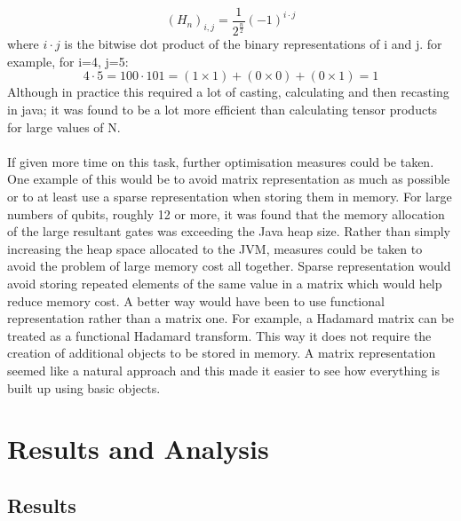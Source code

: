 \documentclass[12pt]{report}
\begin{document}
\begin{equation}
(H_n)_{i,j} = \frac{1}{2^{\frac{n}{2}}}(-1)^{i\cdot j}
\end{equation}
where $i\cdot j$ is the bitwise dot product of the binary representations of i and j. for example, for i=4, j=5:
\begin{equation}
4\cdot 5 = 100 \cdot 101 = (1\times 1)+(0\times 0) +(0 \times 1) = 1
\end{equation}
Although in practice this required a lot of casting, calculating and then recasting in java; it was found to be a lot more efficient than calculating tensor products for large values of N. \\ \\ If given more time on this task, further optimisation measures could be taken.  One example of this would be to avoid matrix representation as much as possible or to at least use a sparse representation when storing them in memory.  For large numbers of qubits, roughly 12 or more, it was found that the memory allocation of the large resultant gates was exceeding the Java heap size.  Rather than simply increasing the heap space allocated to the JVM, measures could be taken to avoid the problem of large memory cost all together.  Sparse representation would avoid storing repeated elements of the same value in a matrix which would help reduce memory cost.  A better way would have been to use functional representation rather than a matrix one.  For example, a Hadamard matrix can be treated as a functional Hadamard transform. This way it does not require the creation of additional objects to be stored in memory.  A matrix representation seemed like a natural approach and this made it easier to see how everything is built up using basic objects.
\chapter{Results and Analysis}
\section{Results}
\end{document}

